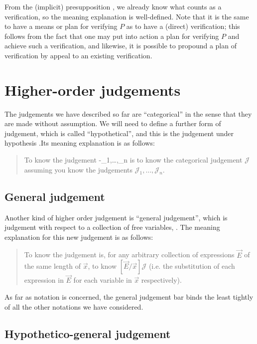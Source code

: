 \documentclass[main.tex]{subfiles}
\begin{document}
From the (implicit) presupposition , we already know what counts as a
verification, so the meaning explanation is well-defined. Note that it is the
same to have a means or plan for verifying $P$ as to have a (direct)
verification; this follows from the fact that one may put into action a plan
for verifying $P$ and achieve such a verification, and likewise, it is possible
to propound a plan of verification by appeal to an existing verification.

\section{Higher-order judgements}

The judgements we have described so far are ``categorical'' in the sense that
they are made without assumption. We will need to define a further form of
judgement, which is called ``hypothetical'', and this is the judgement under
hypothesis .Its
meaning explanation is as follows:

\begin{quote}
  To know the judgement \hyp{}{_1,\dots,_n} is to know the
  categorical judgement $\mathcal{J}$ assuming you know the judgements
  $\mathcal{J}_1,\dots,\mathcal{J}_n$.
\end{quote}

\subsection{General judgement}

Another kind of higher order judgement is ``general judgement'', which is
judgement with respect to a collection of free variables,
. The meaning explanation for this new
judgement is as follows:

\begin{quote}
  To know the judgement  is, for any arbitrary
  collection of expressions $\vec{E}$ of the same length of $\vec{x}$, to know
  $[\vec{E}/\vec{x}]\mathcal{J}$ (i.e. the substitution of each expression in
  $\vec{E}$ for each variable in $\vec{x}$ respectively).
\end{quote}

As far as notation is concerned, the general judgement bar binds the least
tightly of all the other notations we have considered.

\subsection{Hypothetico-general judgement}
\end{document}
